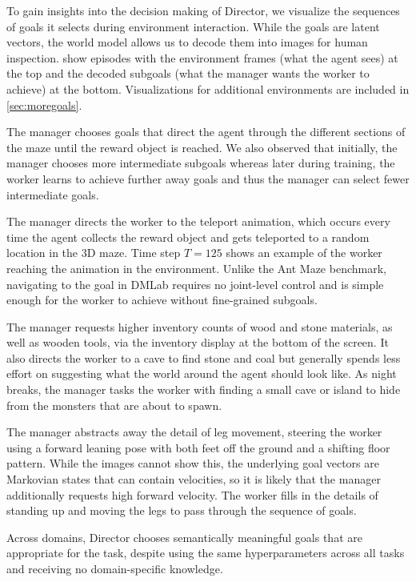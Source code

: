 To gain insights into the decision making of Director, we visualize the sequences of goals it selects during environment interaction. 
While the goals are latent vectors, the world model allows us to decode them into images for human inspection. 
 show episodes with the environment frames (what the agent sees) at the top and the decoded subgoals (what the manager wants the worker to achieve) at the bottom. 
Visualizations for additional environments are included in \cref{sec:moregoals}.

\begin{itemize}

The manager chooses goals that direct the agent through the different sections of the maze until the reward object is reached. 
We also observed that initially, the manager chooses more intermediate subgoals whereas later during training, the worker learns to achieve further away goals and thus the manager can select fewer intermediate goals.

The manager directs the worker to the teleport animation, which occurs every time the agent collects the reward object and gets teleported to a random location in the 3D maze.
Time step $T=125$ shows an example of the worker reaching the animation in the environment. 
Unlike the Ant Maze benchmark, navigating to the goal in DMLab requires no joint-level control and is simple enough for the worker to achieve without fine-grained subgoals.


The manager requests higher inventory counts of wood and stone materials, as well as wooden tools, via the inventory display at the bottom of the screen. 
It also directs the worker to a cave to find stone and coal but generally spends less effort on suggesting what the world around the agent should look like.
As night breaks, the manager tasks the worker with finding a small cave or island to hide from the monsters that are about to spawn.

The manager abstracts away the detail of leg movement, steering the worker using a forward leaning pose with both feet off the ground and a shifting floor pattern. 
While the images cannot show this, the underlying goal vectors are Markovian states that can contain velocities, so it is likely that the manager additionally requests high forward velocity.
The worker fills in the details of standing up and moving the legs to pass through the sequence of goals.

\end{itemize}
\vspace*{-.5ex}

Across domains, Director chooses semantically meaningful goals that are appropriate for the task, despite using the same hyperparameters across all tasks and receiving no domain-specific knowledge.
